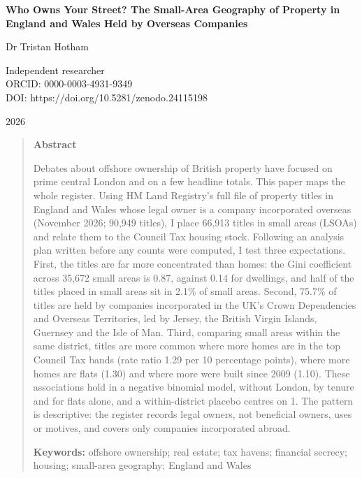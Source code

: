 \documentclass[11pt,a4paper]{article}
\begin{document}
\begin{center}
{\Large\bfseries Who Owns Your Street? The Small-Area Geography of Property in England and Wales Held by Overseas Companies\par}
\vspace{1.2em}
{\large Dr Tristan Hotham\par}
\vspace{0.3em}
{\small Independent researcher\\
ORCID: 0000-0003-4931-9349\\
DOI: https://doi.org/10.5281/zenodo.24115198\par}
\vspace{0.8em}
2026
\end{center}

\begin{quote}
\small
\begin{center}\textbf{Abstract}\end{center}
Debates about offshore ownership of British property have focused on prime central London and on a few headline totals. This paper maps the whole register. Using HM Land Registry's full file of property titles in England and Wales whose legal owner is a company incorporated overseas (November 2026; 90,949 titles), I place 66,913 titles in small areas (LSOAs) and relate them to the Council Tax housing stock. Following an analysis plan written before any counts were computed, I test three expectations. First, the titles are far more concentrated than homes: the Gini coefficient across 35,672 small areas is 0.87, against 0.14 for dwellings, and half of the titles placed in small areas sit in 2.1\% of small areas. Second, 75.7\% of titles are held by companies incorporated in the UK's Crown Dependencies and Overseas Territories, led by Jersey, the British Virgin Islands, Guernsey and the Isle of Man. Third, comparing small areas within the same district, titles are more common where more homes are in the top Council Tax bands (rate ratio 1.29 per 10 percentage points), where more homes are flats (1.30) and where more were built since 2009 (1.10). These associations hold in a negative binomial model, without London, by tenure and for flats alone, and a within-district placebo centres on 1. The pattern is descriptive: the register records legal owners, not beneficial owners, uses or motives, and covers only companies incorporated abroad.

\textbf{Keywords:} offshore ownership; real estate; tax havens; financial secrecy; housing; small-area geography; England and Wales
\end{quote}
\end{document}
